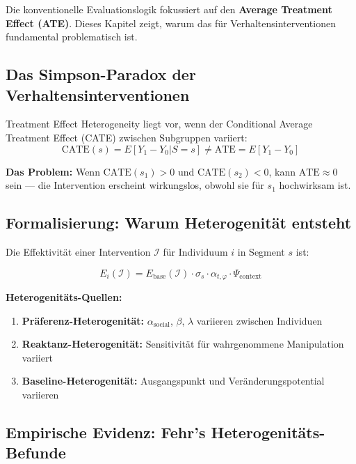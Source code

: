 Die konventionelle Evaluationslogik fokussiert auf den \textbf{Average Treatment Effect (ATE)}. Dieses Kapitel zeigt, warum das für Verhaltensinterventionen fundamental problematisch ist.

\subsection{Das Simpson-Paradox der Verhaltensinterventionen}

\begin{definition}
\label{def:19-het}
Treatment Effect Heterogeneity liegt vor, wenn der Conditional Average Treatment Effect (CATE) zwischen Subgruppen variiert:
\begin{equation}
\text{CATE}(s) = E[Y_1 - Y_0 | S = s] \neq \text{ATE} = E[Y_1 - Y_0]
\label{eq:19-cate}
\end{equation}
\end{definition}

\textbf{Das Problem:} Wenn $\text{CATE}(s_1) > 0$ und $\text{CATE}(s_2) < 0$, kann $\text{ATE} \approx 0$ sein --- die Intervention erscheint wirkungslos, obwohl sie für $s_1$ hochwirksam ist.

\subsection{Formalisierung: Warum Heterogenität entsteht}

Die Effektivität einer Intervention $\mathcal{I}$ für Individuum $i$ in Segment $s$ ist:

\begin{equation}
E_i(\mathcal{I}) = E_{\text{base}}(\mathcal{I}) \cdot \sigma_s \cdot \alpha_{t,\varphi} \cdot \Psi_{\text{context}}
\label{eq:19-full-effectiveness}
\end{equation}

\textbf{Heterogenitäts-Quellen:}
\begin{enumerate}
\item \textbf{Präferenz-Heterogenität:} $\alpha_{\text{social}}$, $\beta$, $\lambda$ variieren zwischen Individuen
\item \textbf{Reaktanz-Heterogenität:} Sensitivität für wahrgenommene Manipulation variiert
\item \textbf{Baseline-Heterogenität:} Ausgangspunkt und Veränderungspotential variieren
\end{enumerate}

\subsection{Empirische Evidenz: Fehr's Heterogenitäts-Befunde}

